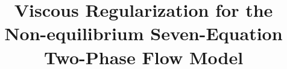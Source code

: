 %
%
%
%
%
%
%
\documentclass[smallcondensed]{svjour3}     %
%
\smartqed  %
%
\usepackage{graphicx}


%
\usepackage{mathptmx}      %
%
%
%




%



\title{Viscous Regularization for the Non-equilibrium Seven-Equation Two-Phase Flow Model}


